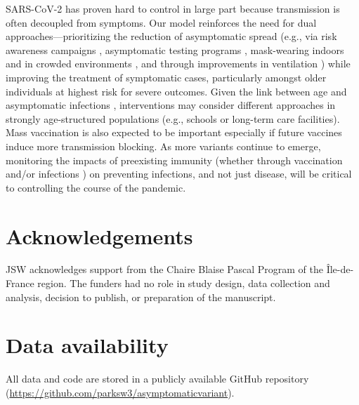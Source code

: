 \documentclass[12pt]{article}
\begin{document}
SARS-CoV-2 has proven hard to control in large part because transmission is often decoupled from symptoms. 
Our model reinforces the need for dual approaches---prioritizing the reduction of asymptomatic spread (e.g., via risk awareness campaigns \citep{chande2020real,sinclair2021pairing}, asymptomatic testing programs \citep{mina2021covid,gibson2022surv}, mask-wearing indoors and in crowded environments \citep{jones2020two,prather2020reducing,howard2021ev}, and through improvements in ventilation \citep{allen2021indoor,wang2021airborne}) while improving the treatment of symptomatic cases, particularly amongst older individuals at highest risk for severe outcomes.
Given the link between age and asymptomatic infections \citep{davies2020}, interventions may consider different approaches in strongly age-structured populations (e.g., schools or long-term care facilities).
Mass vaccination is also expected to be important especially if future vaccines induce more transmission blocking.
As more variants continue to emerge, monitoring the impacts of preexisting immunity (whether through vaccination and/or infections  \citep{lopman2021framework}) on preventing infections, and not just disease, will be critical to controlling the course of the pandemic.

\section*{Acknowledgements}

JSW acknowledges support from the Chaire Blaise Pascal Program of the Île-de-France region.
The funders had no role in study design, data collection and analysis, decision to publish, or preparation of the manuscript. 

\section*{Data availability}

All data and code are stored in a publicly available GitHub repository (\url{https://github.com/parksw3/asymptomaticvariant}).
\end{document}
